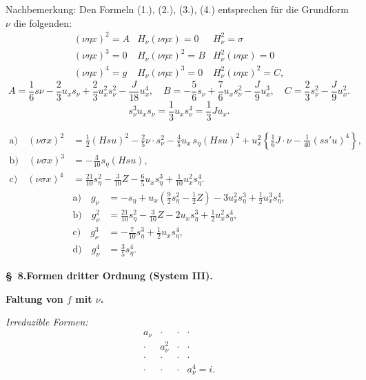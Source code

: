 \documentclass[11pt]{article}
\begin{document}
Nachbemerkung: Den Formeln (1.), (2.), (3.), (4.) entsprechen für die Grundform $\nu$ die folgenden:
\[
\tag{5}
\begin{array}{c|c|c}
(\nu\eta x)^2=A & H_\nu(\nu\eta x)=0 & H_\nu^2=\sigma\\[0.4em]
(\nu\eta x)^3=0 & H_\nu(\nu\eta x)^2=B & H_\nu^2(\nu\eta x)=0\\[0.4em]
(\nu\eta x)^4=g & H_\nu(\nu\eta x)^3=0 & H_\nu^2(\nu\eta x)^2=C,
\end{array}
\]
\[
A=\frac16s\nu-\frac23u_xs_\nu+\frac23u_x^2s_\nu^2-\frac{J}{18}u_x^4,
\quad B=-\frac56s_\nu+\frac76u_xs_\nu^2-\frac{J}{9}u_x^3,
\quad C=\frac23s_\nu^2-\frac{J}{9}u_x^2.
\]
\[
\tag{6}
s_\nu^3u_xs_\nu=\frac13u_xs_\nu^4=\frac13Ju_x.
\]


\[
\tag{7}
\begin{aligned}
\text{a)}\quad (\nu\sigma x)^2
&=\frac12(Hsu)^2-\frac25\nu\cdot s_\nu^2-
\frac45u_x\,s_\eta(Hsu)^2
+u_x^2\left\{\frac16J\cdot\nu-\frac1{40}(ss'u)^4\right\},\\
\text{b)}\quad (\nu\sigma x)^3&=-\frac3{10}s_\eta(Hsu),\\
\text{c)}\quad (\nu\sigma x)^4&=\frac{21}{10}s_\eta^2-\frac3{10}Z-
\frac65u_xs_\eta^3+\frac1{10}u_x^2s_\eta^4.
\end{aligned}
\]
\[
\tag{8}
\begin{aligned}
\text{a)}\quad g_\nu&=-s_\eta+u_x\left(\frac92s_\eta^2-\frac12Z\right)-3u_x^2s_\eta^3+\frac12u_x^3s_\eta^4,\\
\text{b)}\quad g_\nu^2&=\frac{21}{10}s_\eta^2-\frac3{10}Z-2u_xs_\eta^3+\frac12u_x^2s_\eta^4,\\
\text{c)}\quad g_\nu^3&=-\frac7{10}s_\eta^3+\frac12u_xs_\eta^4,\\
\text{d)}\quad g_\nu^4&=\frac35s_\eta^4.
\end{aligned}
\]

\begin{center}
\textbf{\S\ 8.\quad Formen dritter Ordnung (System III).}
\end{center}

\noindent\textbf{Faltung von $f$ mit $\nu$.}

\noindent\emph{Irreduzible Formen:}
\[
\begin{array}{cccc}
a_\nu&\cdot&\cdot&\cdot\\
\cdot&a_\nu^2&\cdot&\cdot\\
\cdot&\cdot&\cdot&\cdot\\
\cdot&\cdot&\cdot&a_\nu^4=i.
\end{array}
\]
\end{document}
